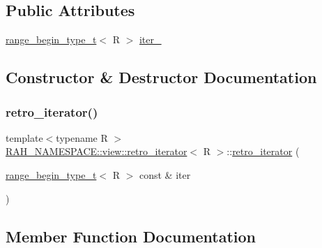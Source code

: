 \subsection*{Public Attributes}
\begin{DoxyCompactItemize}
\item 
\mbox{\hyperlink{namespace_r_a_h___n_a_m_e_s_p_a_c_e_a46705781d6869d5151141f871ced1e9c}{range\+\_\+begin\+\_\+type\+\_\+t}}$<$ R $>$ \mbox{\hyperlink{struct_r_a_h___n_a_m_e_s_p_a_c_e_1_1view_1_1retro__iterator_a610c34a743bd3c125feec7ad1eebbdad}{iter\+\_\+}}
\end{DoxyCompactItemize}


\subsection{Constructor \& Destructor Documentation}
\mbox{\label{struct_r_a_h___n_a_m_e_s_p_a_c_e_1_1view_1_1retro__iterator_adb9205eb961750d70b557e4feb097e90}} 
\subsubsection{\texorpdfstring{retro\_iterator()}{retro\_iterator()}}
{\footnotesize\ttfamily template$<$typename R $>$ \\
\mbox{\hyperlink{struct_r_a_h___n_a_m_e_s_p_a_c_e_1_1view_1_1retro__iterator}{R\+A\+H\+\_\+\+N\+A\+M\+E\+S\+P\+A\+C\+E\+::view\+::retro\+\_\+iterator}}$<$ R $>$\+::\mbox{\hyperlink{struct_r_a_h___n_a_m_e_s_p_a_c_e_1_1view_1_1retro__iterator}{retro\+\_\+iterator}} (\begin{DoxyParamCaption}\item[{\mbox{\hyperlink{namespace_r_a_h___n_a_m_e_s_p_a_c_e_a46705781d6869d5151141f871ced1e9c}{range\+\_\+begin\+\_\+type\+\_\+t}}$<$ R $>$ const \&}]{iter }\end{DoxyParamCaption})\hspace{0.3cm}{\ttfamily [inline]}}



\subsection{Member Function Documentation}
\mbox{\label{struct_r_a_h___n_a_m_e_s_p_a_c_e_1_1view_1_1retro__iterator_abcb1e1453c7577e8a79ebad3f81ead98}} 
